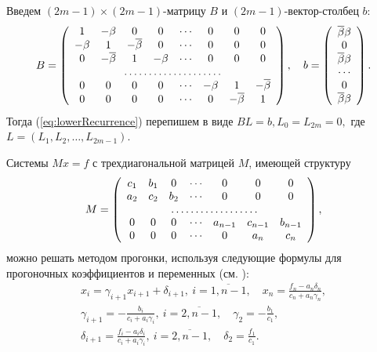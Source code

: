 Введем $(2m-1)\times(2m-1)$-матрицу $B$ и $(2m-1)$-вектор-столбец $b$:
\begin{equation*}
  B =
  \left(
    \begin{array}{cccccccc}
      1      & -\Co  & 0       & 0      & \cdots & 0      & 0       & 0       \\
      -\Co & 1       & -\DCo & 0      & \cdots & 0      & 0       & 0       \\
      0      & -\DCo & 1       & -\Co & \cdots & 0      & 0       & 0       \\
      \hdotsfor{8}                                                              \\
      0      & 0       & 0       & 0      & \cdots & -\Co & 1       & -\DCo \\
      0      & 0       & 0       & 0      & \cdots & 0      & -\DCo & 1 
    \end{array}
  \right),\quad
  b = \left(
    \begin{array}{c}
      \DCo\Co \\
      0           \\
      \DCo\Co \\
      \cdots      \\
      0           \\
      \DCo\Co
    \end{array}
  \right).
\end{equation*}
Тогда (\ref{eq:lowerRecurrence}) перепишем в виде $ BL = b, L_0 = L_{2m} = 0, $
где $L = (L_1, L_2, \ldots, L_{2m-1})$.

Системы $ Mx = f $ с трехдиагональной матрицей $ M $, имеющей структуру
\[
  M = \left(\begin{array}{ccccccc}
              c_1 & b_1 & 0   & \cdots & 0       & 0       & 0       \\
              a_2 & c_2 & b_2 & \cdots & 0       & 0       & 0       \\
              \hdotsfor{7}                                           \\
              0   & 0   & 0   & \cdots & a_{n-1} & c_{n-1} & b_{n-1} \\
              0 & 0 & 0 & \cdots & 0 & a_n & c_n
            \end{array}\right),
\]
можно решать методом прогонки, используя следующие формулы для
прогоночных коэффициентов и переменных (см. \cite{samarsky89}):
\begin{gather*}
  x_i = \gamma_{i+1} x_{i+1} + \delta_{i+1}, \: i = \overline{1,n-1},
  \quad
  x_n = \frac{f_n - a_n\delta_n}{c_n + a_n\gamma_n}, \\
  \gamma_{i+1} = -\frac{b_i}{c_i + a_i\gamma_i}, \: i = \overline{2,
    n-1}, \quad
  \gamma_2 = -\frac{b_1}{c_1}, \\
  \delta_{i+1} = \frac{f_i - a_i\delta_i}{c_i + a_i\gamma_i}, \: i =
  \overline{2, n-1}, \quad \delta_2 = \frac{f_1}{c_1}.
\end{gather*}

